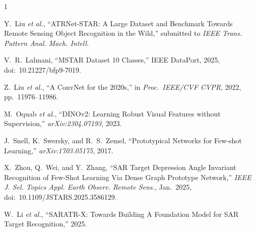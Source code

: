 \documentclass[journal]{IEEEtran}
\begin{document}
\begin{thebibliography}{1}

Y.~Liu \textit{et al.}, ``ATRNet-STAR: A Large Dataset and Benchmark Towards
Remote Sensing Object Recognition in the Wild,'' submitted to \textit{IEEE
Trans. Pattern Anal. Mach. Intell.}

V.~R.~Lalmani, ``MSTAR Dataset 10 Classes,'' IEEE DataPort, 2025,
doi:~10.21227/bfp9-7019.

Z.~Liu \textit{et al.}, ``A ConvNet for the 2020s,'' in \textit{Proc.\
IEEE/CVF CVPR}, 2022, pp.~11976--11986.

M.~Oquab \textit{et al.}, ``DINOv2: Learning Robust Visual Features without
Supervision,'' \textit{arXiv:2304.07193}, 2023.

J.~Snell, K.~Swersky, and R.~S.~Zemel, ``Prototypical Networks for Few-shot
Learning,'' \textit{arXiv:1703.05175}, 2017.

X.~Zhou, Q.~Wei, and Y.~Zhang, ``SAR Target Depression Angle Invariant
Recognition of Few-Shot Learning Via Dense Graph Prototype Network,''
\textit{IEEE J. Sel. Topics Appl. Earth Observ. Remote Sens.}, Jan.~2025,
doi:~10.1109/JSTARS.2025.3586129.

W.~Li \textit{et al.}, ``SARATR-X: Towards Building A Foundation Model for
SAR Target Recognition,'' 2025.

\end{thebibliography}
\end{document}
